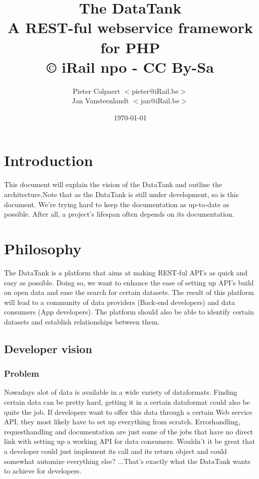 \documentclass[12pt]{book}
\title{The DataTank\\
  \small A REST-ful webservice framework for PHP\\
  © iRail npo - CC By-Sa}
\author{
  Pieter Colpaert $<$pieter@iRail.be$>$\\
  Jan Vansteenlandt $<$jan@iRail.be$>$
}
\date{\today}
\begin{document}
\maketitle\setlength{\parindent}{0pt}

\thispagestyle{empty}
\tableofcontents





\chapter{Introduction}

This document will explain the vision of the DataTank and outline the architecture.Note that as the DataTank is still under development, so is this document. We're trying hard to keep the documentation as up-to-date as possible. After all, a project's lifespan often depends on its documentation.

\chapter{Philosophy}
The DataTank is a platform that aims at making REST-ful API's as quick and easy as possible. Doing so, we want to enhance the ease of setting up API's build on open data and ease the search for certain datasets. The result of this platform will lead to a community of data providers (Back-end developers) and data consumers (App developers). The platform should also be able to identify certain datasets and establish relationships between them.

\section{Developer vision}
\subsection{Problem}

Nowadays alot of data is available in a wide variety of dataformats. Finding certain data can be pretty hard, getting it in a certain dataformat could also be quite the job. If developers want to offer this data through a certain Web service API, they most likely have to set up everything from scratch. Errorhandling, requesthandling and documentation are just some of the jobs that have no direct link with setting up a working API for data consumers. Wouldn't it be great that a developer could just implement its call and its return object and could somewhat automize everything else? ...That's exactly what the DataTank wants to achieve for developers.
\end{document}
